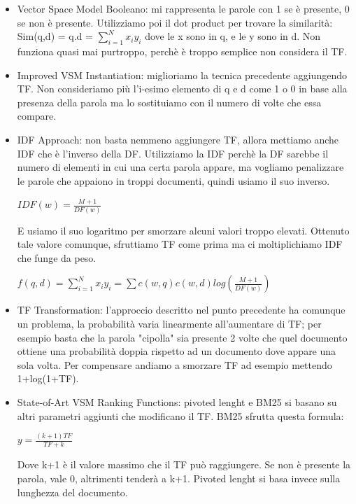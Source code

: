 \begin{itemize}
    \item Vector Space Model Booleano: mi rappresenta le parole con 1 se è presente, 0 se non è presente. Utilizziamo poi il dot product per trovare la similarità: Sim(q,d) = q.d = $\sum_{i=1}^{N} x_i y_i$ dove le x sono in q, e le y sono in d. Non funziona quasi mai purtroppo, perchè è troppo semplice non considera il TF.
    \item Improved VSM Instantiation: miglioriamo la tecnica precedente aggiungendo TF. Non consideriamo più l'i-esimo elemento di q e d come 1 o 0 in base alla presenza della parola ma lo sostituiamo con il numero di volte che essa compare.  
    \item IDF Approach: non basta nemmeno aggiungere TF, allora mettiamo anche IDF che è l'inverso della DF. Utilizziamo la IDF perchè la DF sarebbe il numero di elementi in cui una certa parola appare, ma vogliamo penalizzare le parole che appaiono in troppi documenti, quindi usiamo il suo inverso. 
    \begin{center}
        \begin{math}
            IDF(w) = \frac{M+1}{DF(w)}
        \end{math}
    \end{center}
    E usiamo il suo logaritmo per smorzare alcuni valori troppo elevati. Ottenuto tale valore comunque, sfruttiamo TF come prima ma ci moltiplichiamo IDF che funge da peso. 
    \begin{center}
        \begin{math}
            f(q,d) = \sum_{i=1}^{N} x_i y_i = \sum c(w, q) c(w, d) log(\frac{M+1}{DF(w)})
        \end{math}
    \end{center}
    \item TF Transformation: l'approccio descritto nel punto precedente ha comunque un problema, la probabilità varia linearmente all'aumentare di TF; per esempio basta che la parola "cipolla" sia presente 2 volte che quel documento ottiene una probabilità doppia rispetto ad un documento dove appare una sola volta. Per compensare andiamo a smorzare TF ad esempio mettendo 1+log(1+TF).
    \item State-of-Art VSM Ranking Functions: pivoted lenght e BM25 si basano su altri parametri aggiunti che modificano il TF. BM25 sfrutta questa formula: 
    \begin{center}
        \begin{math}
            y = \frac{(k+1)TF}{TF+k}
        \end{math}
    \end{center}
    Dove k+1 è il valore massimo che il TF può raggiungere. Se non è presente la parola, vale 0, altrimenti tenderà a k+1. Pivoted lenght si basa invece sulla lunghezza del documento. 
\end{itemize}

